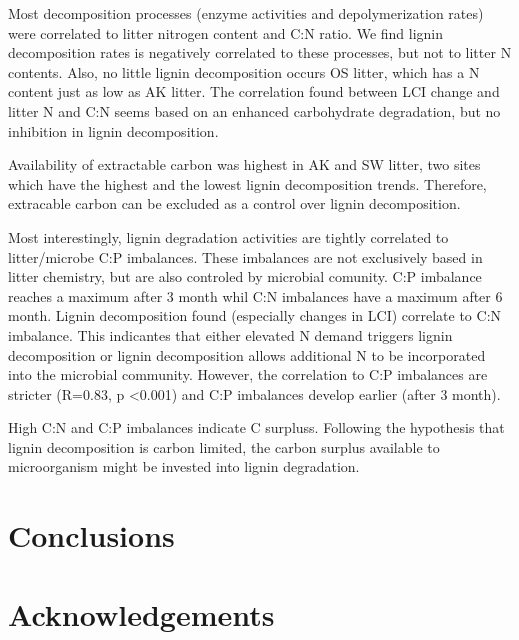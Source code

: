 \documentclass[authoryear,preprint,review,12pt]{elsarticle}
\begin{document}
Most decomposition processes (enzyme activities and depolymerization rates) were correlated to litter nitrogen content and C:N ratio. We find lignin decomposition rates is negatively correlated to these processes, but not to litter N contents. Also, no little lignin decomposition occurs OS litter, which has a N content just as low as AK litter. The correlation found between LCI change and litter N and C:N seems based on an enhanced carbohydrate degradation, but no inhibition in lignin decomposition.

Availability of extractable carbon was highest in AK and SW litter, two sites which have the highest and the lowest lignin decomposition trends. Therefore, extracable carbon can be excluded as a control over lignin decomposition.

Most interestingly, lignin degradation activities are tightly correlated to litter/microbe C:P imbalances. These imbalances are not exclusively based in litter chemistry, but are also controled by microbial comunity. C:P imbalance reaches a maximum after 3 month whil C:N imbalances have a maximum after 6 month. Lignin decomposition found (especially changes in LCI) correlate to C:N imbalance. This indicantes that either elevated N demand triggers lignin decomposition or lignin decomposition allows additional N to be incorporated into the microbial community. However, the correlation to C:P imbalances are stricter (R=0.83, p \textless 0.001) and C:P imbalances develop earlier (after 3 month).

High C:N and C:P imbalances indicate C surpluss. Following the hypothesis that lignin decomposition is carbon limited, the carbon surplus available to microorganism might be invested into lignin degradation.

\section{Conclusions}



\section{Acknowledgements}



\end{document}
